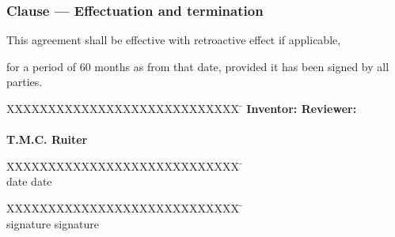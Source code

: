 \documentclass[a4paper]{article}
\newcounter{clausenr}
\newcommand{\clause}[1]{\addtocounter{clausenr}{1}\subsubsection{Clause \Roman{clausenr} --- #1}}
\begin{document}
\clause{Effectuation and termination}
This agreement shall be effective with retroactive effect if applicable,

for a period of 60 months as from that date,
provided it has been signed by all parties.

\vspace{1cm}

\begin{tabbing}
XXXXXXXXXXXXXXXXXXXXXXXXXXXX \= \kill
\bfseries Inventor: \> \bfseries Reviewer: \\
\\
T.M.C. Ruiter \> \\
\end{tabbing}
\begin{tabbing}
XXXXXXXXXXXXXXXXXXXXXXXXXXXX \= \kill
\makebox[5cm]{\dotfill} \> \makebox[5cm]{\dotfill} \\
\tiny date \> \tiny date
\end{tabbing}
\vspace{1cm}
\begin{tabbing}
XXXXXXXXXXXXXXXXXXXXXXXXXXXX \= \kill
\makebox[5cm]{\dotfill} \> \makebox[5cm]{\dotfill} \\
\tiny signature \> \tiny signature
\end{tabbing}
\end{document}

